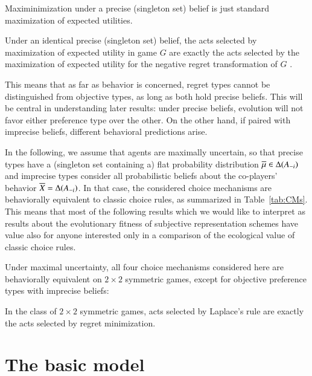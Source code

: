 \documentclass[fleqn,reqno,11pt]{article}
\begin{document}
\begin{fact} \label{fact:singleton probability set}
Maximinimization under a precise (singleton set) belief is just standard
maximization of expected utilities.
\end{fact}

\begin{fact} \label{fact:maxEU-minReg} Under an identical precise (singleton set) belief, the
  acts selected by maximization of expected utility in game $G$ are exactly the acts selected
  by the maximization of expected utility for the negative regret transformation of $G$
  \citep[e.g.,][]{HalpernPass2012:Iterated-Regret}.
\end{fact}

This means that as far as behavior is concerned, regret types cannot be distinguished from
objective types, as long as both hold precise beliefs. This will be central in understanding
later results: under precise beliefs, evolution will not favor either preference type over the
other. On the other hand, if paired with imprecise beliefs, different behavioral predictions
arise. 

In the following, we assume that agents are maximally uncertain, so that precise types have a
(singleton set containing a) flat probability distribution
$\overline{\mu} \in \Delta(A_{-i})$ and imprecise types consider all probabilistic beliefs
about the co-players' behavior $\overline{X} = \Delta(A_{-i})$. In that case, the
considered choice mechanisms are behaviorally equivalent to classic choice rules, as summarized
in Table~\ref{tab:CMs}. This means that most of the following results which we would like to
interpret as results about the evolutionary fitness of subjective representation schemes have
value also for anyone interested only in a comparison of the ecological value of classic choice
rules.

Under maximal uncertainty, all four choice mechanisms considered here are behaviorally
equivalent on $2 \times 2$ symmetric games, except for objective preference types with
imprecise beliefs:

\begin{fact} \label{fact:equivalence2x2} In the class of $2 \times 2$ symmetric games, acts
  selected by Laplace's rule are exactly the acts selected by regret minimization. 
\end{fact} 


\section{The basic model}
\label{sec:basic-model-1}
\end{document}
